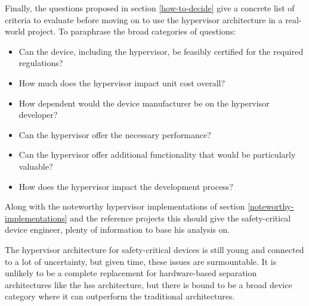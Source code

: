 Finally, the questions proposed in section \ref{how-to-decide} give a concrete list of criteria to evaluate before moving on to use the hypervisor architecture in a real-world project. To paraphrase the broad categories of questions:
\begin{itemize}
    \item Can the device, including the hypervisor, be feasibly certified for the required regulations?
    \item How much does the hypervisor impact unit cost overall?
    \item How dependent would the device manufacturer be on the hypervisor developer?
    \item Can the hypervisor offer the necessary performance?
    \item Can the hypervisor offer additional functionality that would be particularly valuable?
    \item How does the hypervisor impact the development process?
\end{itemize}
Along with the noteworthy hypervisor implementations of section \ref{noteworthy-implementations} and the reference projects this should give the safety-critical device engineer, plenty of information to base his analysis on. 

The hypervisor architecture for safety-critical devices is still young and connected to a lot of uncertainty, but given time, these issues are surmountable. It is unlikely to be a complete replacement for hardware-based separation architectures like the \acrshort{hss} architecture, but there is bound to be a broad device category where it can outperform the traditional architectures.


\begin{comment} 
* Mixed criticality has been present for a long time in very complex projects but with increased processing power and user demands it makes more and more sense in smaller devices.
* For this reason and because of efforts in some industries to save SWaP alternate solutions to the mixed criticality problem have been seeing some adoption.
* One of these is the hypervisor that this thesis set out to compare more in-depth.
* From that comparison the crucial differences and their effects emerged
* [Refer to conclusion from that section]
* Based on this some reference project have been proposed that can be categorized into these [] categories.
* Ultimately it can be said the hypervisor has a couple of very promising places of application.
* So it can be said the best scenarios for the hypervisor architecture are the ones where this happens: []
* The advent of microkernel based safety hypervisors along with the maturation in virtualization technology, especially in the embedded space provides an avenue to deal with the problems that arise from mixed criticality.
\end{comment}

